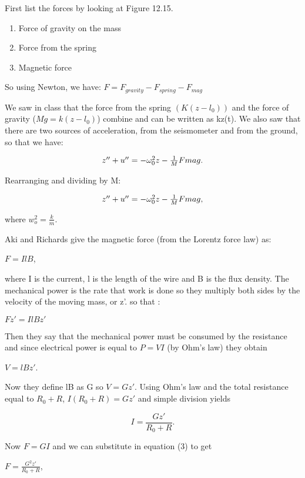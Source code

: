 \documentclass[overlapped,line,letterpaper]{res}
\begin{document}
\begin{resume}
First list the forces by looking at Figure 12.15. 
\begin{enumerate}
	\item Force of gravity on the mass
	\item Force from the spring
	\item Magnetic force 
\end{enumerate}

So using Newton, we have:
$F = F_{gravity} -F_{spring} - F_{mag}$

We saw in class that the force from the spring $(K(z-l_0))$ and the force of gravity ($Mg =k(z-l_0) $) combine and can be written as kz(t). We also saw that there are two sources of acceleration, from the seismometer and from the ground, so that we have:

\begin{equation}
$$$$z'' +u'' = -\omega_0^2z -\frac{1}{M}F{mag}. $$$$
\end{equation}

Rearranging and dividing by M:

\begin{equation}
$$$$z'' +u'' = -\omega_0^2z -\frac{1}{M}F{mag}, $$$$
\end{equation}

where $w_o^2=\frac{k}{m}$.


Aki and Richards give the magnetic force (from the Lorentz force law) as:

$F=IlB$,

where I is the current, l is the length of the wire and B is the flux density. The mechanical power is the rate that work is done so they multiply both sides by the velocity of the moving mass, or z'. so that : 

$Fz' = IlBz'$

Then they say that the mechanical power must be consumed by the resistance and since electrical power is equal to $P = VI$ (by Ohm's law) they obtain

 $V = lBz'$.

 Now they define lB as G so $V=Gz'$. Using Ohm's law and the total resistance equal to $R_0 + R$, $I(R_0 +R) = Gz'$ and simple division yields

\begin{equation}
	 I = \frac{Gz'}{R_0 +R}.
	 \label{eqn1}
\end{equation}

Now $F = GI$ and we can substitute in equation (3) to get

$F = \frac{G^2z'}{R_0+R}$,


\end{resume}
\end{document}
